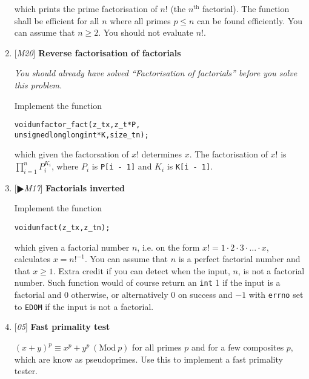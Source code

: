 \begin{enumerate}[label=\textbf{\arabic*}.]
\noindent
which prints the prime factorisation of $n!$
(the $n^{\text{th}}$ factorial). The function shall
be efficient for all $n$ where all primes $p \le n$
can be found efficiently. You can assume that
$n \ge 2$. You should not evaluate $n!$.



\item {[\textit{M20}]} \textbf{Reverse factorisation of factorials}

{\small\textit{You should already have solved
``Factorisation of factorials'' before you solve
this problem.}}

Implement the function

\vspace{-1em}
\begin{alltt}
   void unfactor_fact(z_t x, z_t *P,
        unsigned long long int *K, size_t n);
\end{alltt}
\vspace{-1em}

\noindent
which given the factorsation of $x!$ determines $x$.
The factorisation of $x!$ is
$\displaystyle{\prod_{i = 1}^{n} P_i^{K_i}}$, where
$P_i$ is \texttt{P[i - 1]} and $K_i$ is \texttt{K[i - 1]}.



\item {[$\RHD$\textit{M17}]} \textbf{Factorials inverted}

Implement the function

\vspace{-1em}
\begin{alltt}
   void unfact(z_t x, z_t n);
\end{alltt}
\vspace{-1em}

\noindent
which given a factorial number $n$, i.e. on the form
$x! = 1 \cdot 2 \cdot 3 \cdot \ldots \cdot x$,
calculates $x = n!^{-1}$. You can assume that
$n$ is a perfect factorial number and that $x \ge 1$.
Extra credit if you can detect when the input, $n$,
is not a factorial number. Such function would of
course return an \texttt{int} 1 if the input is a
factorial and 0 otherwise, or alternatively 0
on success and $-1$ with \texttt{errno} set to
\texttt{EDOM} if the input is not a factorial.



\item {[\textit{05}]} \textbf{Fast primality test}

$(x + y)^p \equiv x^p + y^p ~(\text{Mod}~p)$
for all primes $p$ and for a few composites $p$,
which are know as pseudoprimes. Use this to implement
a fast primality tester.




\end{enumerate}
